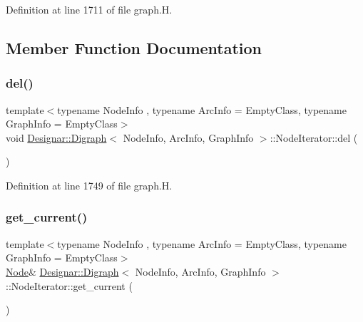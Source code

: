 Definition at line 1711 of file graph.\+H.



\subsection{Member Function Documentation}
\mbox{\label{class_designar_1_1_digraph_1_1_node_iterator_a8d68d82384631f601055ef9b742b0dbf}} 
\subsubsection{\texorpdfstring{del()}{del()}}
{\footnotesize\ttfamily template$<$typename Node\+Info , typename Arc\+Info  = Empty\+Class, typename Graph\+Info  = Empty\+Class$>$ \\
void \hyperlink{class_designar_1_1_digraph}{Designar\+::\+Digraph}$<$ Node\+Info, Arc\+Info, Graph\+Info $>$\+::Node\+Iterator\+::del (\begin{DoxyParamCaption}{ }\end{DoxyParamCaption})\hspace{0.3cm}{\ttfamily [inline]}}



Definition at line 1749 of file graph.\+H.

\mbox{\label{class_designar_1_1_digraph_1_1_node_iterator_a2d9961869a4ec52a112354600094646c}} 
\subsubsection{\texorpdfstring{get\+\_\+current()}{get\_current()}\hspace{0.1cm}{\footnotesize\ttfamily [1/2]}}
{\footnotesize\ttfamily template$<$typename Node\+Info , typename Arc\+Info  = Empty\+Class, typename Graph\+Info  = Empty\+Class$>$ \\
\hyperlink{class_designar_1_1_digraph_a4dc921c41a480b7946a04170e997d8ae}{Node}\& \hyperlink{class_designar_1_1_digraph}{Designar\+::\+Digraph}$<$ Node\+Info, Arc\+Info, Graph\+Info $>$\+::Node\+Iterator\+::get\+\_\+current (\begin{DoxyParamCaption}{ }\end{DoxyParamCaption})\hspace{0.3cm}{\ttfamily [inline]}}



